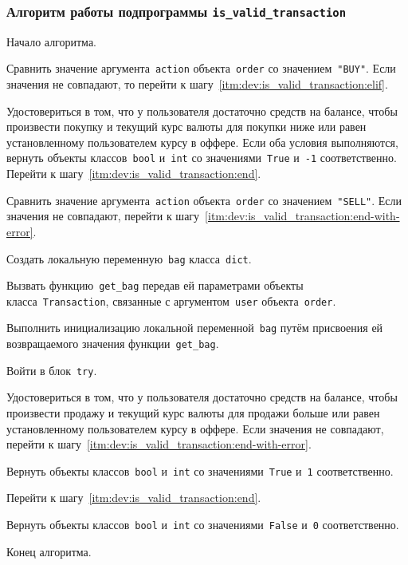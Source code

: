 \subsubsection{Алгоритм работы подпрограммы \lstinline{is_valid_transaction}}

\begin{enumerate_step}
    \item Начало алгоритма.

    \item Сравнить значение аргумента~\lstinline{action} объекта~\lstinline{order} со значением~\lstinline{"BUY"}.
    Если значения не совпадают, то перейти к шагу~\ref{itm:dev:is_valid_transaction:elif}.
    \item Удостовериться в том, что у пользователя достаточно средств на балансе, чтобы произвести покупку и
    текущий курс валюты для покупки ниже или равен установленному пользователем курсу в оффере.
    Если оба условия выполняются, вернуть объекты классов~\lstinline{bool} и~\lstinline{int} со значениями~\lstinline{True} и~\lstinline{-1} соответственно.
    Перейти к шагу~\ref{itm:dev:is_valid_transaction:end}.

    \item\label{itm:dev:is_valid_transaction:elif}
    Сравнить значение аргумента~\lstinline{action} объекта~\lstinline{order} со значением~\lstinline{"SELL"}.
    Если значения не совпадают, перейти к шагу~\ref{itm:dev:is_valid_transaction:end-with-error}.

    \item Создать локальную переменную~\lstinline{bag} класса~\lstinline{dict}.
    \item Вызвать функцию~\lstinline{get_bag} передав ей параметрами объекты класса~\lstinline{Transaction},
    связанные с аргументом~\lstinline{user} объекта~\lstinline{order}.
    \item Выполнить инициализацию локальной переменной~\lstinline{bag}
    путём присвоения ей возвращаемого значения функции~\lstinline{get_bag}.

    \item Войти в блок~\lstinline{try}.
    \item Удостовериться в том, что у пользователя достаточно средств на балансе, чтобы произвести продажу и
    текущий курс валюты для продажи больше или равен установленному пользователем курсу в оффере.
    Если значения не совпадают, перейти к шагу~\ref{itm:dev:is_valid_transaction:end-with-error}.
    \item Вернуть объекты классов~\lstinline{bool} и~\lstinline{int} со значениями~\lstinline{True} и~\lstinline{1} соответственно.
    \item Перейти к шагу~\ref{itm:dev:is_valid_transaction:end}.

    \item\label{itm:dev:is_valid_transaction:end-with-error}
    Вернуть объекты классов~\lstinline{bool} и~\lstinline{int} со значениями~\lstinline{False} и~\lstinline{0} соответственно.
    \item\label{itm:dev:is_valid_transaction:end} Конец алгоритма.
\end{enumerate_step}

